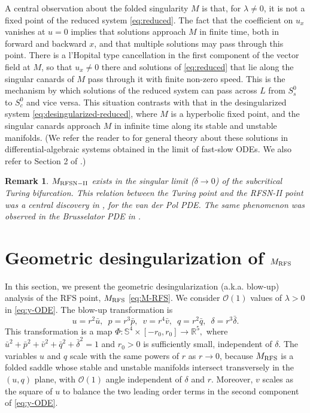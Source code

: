 \documentclass[11pt]{article}
\numberwithin{equation}{section}
\newtheorem{remark}{Remark}[section]
\begin{document}
A central observation about the folded singularity $M$ is that, for $\lambda\ne 0$, it is not a fixed point of the reduced system \eqref{eq:reduced}.
The fact that the coefficient on $u_x$ vanishes at $u=0$ implies that solutions approach $M$ in finite time, both in forward and backward $x$,
and that multiple solutions may pass through this point.
There is a l'Hopital type cancellation in the first component of the vector field at $M$, so that $u_x \ne 0$ there and solutions of \eqref{eq:reduced} that lie along the singular canards of $M$ pass through it with finite non-zero speed.
This is the mechanism by which solutions of the reduced system can pass across $L$ from $S_s^0$ to $S_c^0$ and vice versa.
This situation contrasts with that in the desingularized system \eqref{eq:desingularized-reduced}, where $M$ is a hyperbolic fixed point, and the singular canards approach $M$ in infinite time along its stable and unstable manifolds.
(We refer the reader to \cite{T1976} for general theory about these solutions in differential-algebraic systems obtained in the limit of fast-slow ODEs.
We also refer to Section 2 of \cite{KS2001}.)


\begin{remark}
    $M_{\rm RFSN-II}$ exists in the singular limit ($\delta \to 0$) of the subcritical Turing bifurcation.
    This relation between the Turing point and the RFSN-II point was a central discovery in \cite{VDK2025}, for the van der Pol PDE. 
    The same phenomenon was observed in the Brusselator PDE in \cite{JDKV2026}.
\end{remark}





\section{Geometric desingularization of \texorpdfstring{$M_{\rm RFS}$}{Lg}}\label{sec:geodesing}

In this section, we present the geometric desingularization (a.k.a. blow-up) analysis of the RFS point, $M_{\rm RFS}$ \eqref{eq:M-RFS}.
We consider $\mathcal{O}(1)$ values of $\lambda>0$ in \eqref{eq:y-ODE}. 
The blow-up transformation is
\begin{equation}\label{eq:blowup}
u = r^2 \bar{u}, \, \, \,
p = r^3 \bar{p}, \, \, \,
v = r^4 \bar{v}, \, \, \,
q= r^2 \bar{q}, \, \, \,
\delta = r^3 \bar{\delta}.
\end{equation}
This transformation is a map
$\Phi: \mathbb{S}^4 \times [-r_0,r_0]  \to \mathbb{R}^5,$
where $\bar{u}^2 + \bar{p}^2 + \bar{v}^2 + \bar{q}^2 + \bar{\delta}^2 = 1$ and $r_0>0$ is sufficiently small, independent of $\delta$.
The variables $u$ and $q$ scale with the same powers of $r$ as $r \to 0$, because $M_{\rm RFS}$ is a folded saddle whose stable and unstable manifolds intersect transversely in the $(u,q)$ plane, with $\mathcal{O}(1)$ angle independent of $\delta$ and $r$.
Moreover, $v$ scales as the square of $u$ to balance the two leading order terms in the second component of \eqref{eq:y-ODE}.
\end{document}
